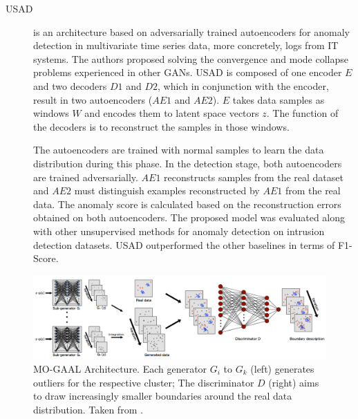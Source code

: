 \begin{description}
    \item[USAD \cite{audibert.etal_USADUnSupervisedAnomaly_2020}] is an architecture based on adversarially trained autoencoders for anomaly detection in multivariate time series data, more concretely, logs from IT systems. The authors proposed solving the convergence and mode collapse problems experienced in other GANs. USAD is composed of one encoder $E$ and two decoders $D1$ and $D2$, which in conjunction with the encoder, result in two autoencoders ($AE1$ and $AE2$). $E$ takes data samples as windows $W$ and encodes them to latent space vectors $z$. The function of the decoders is to reconstruct the samples in those windows. 
    
    The autoencoders are trained with normal samples to learn the data distribution during this phase. In the detection stage, both autoencoders are trained adversarially. $AE1$ reconstructs samples from the real dataset and $AE2$ must distinguish examples reconstructed by $AE1$ from the real data. The anomaly score is calculated based on the reconstruction errors obtained on both autoencoders. The proposed model was evaluated along with other unsupervised methods for anomaly detection on intrusion detection datasets. USAD outperformed the other baselines in terms of F1-Score.
\end{description}

\begin{figure}[]
\centering
\includegraphics[width=\textwidth]{figures/moogal_arch.png}
\caption[MO-GAAL Architecture]{MO-GAAL Architecture. Each generator $G_i$ to $G_k$ (left) generates outliers for the respective cluster; The discriminator $D$ (right) aims to draw increasingly smaller boundaries around the real data distribution. Taken from \cite{liu.etal_GenerativeAdversarialActive_2020}.}
\label{fig:mo_gaal_arch}
\end{figure}

